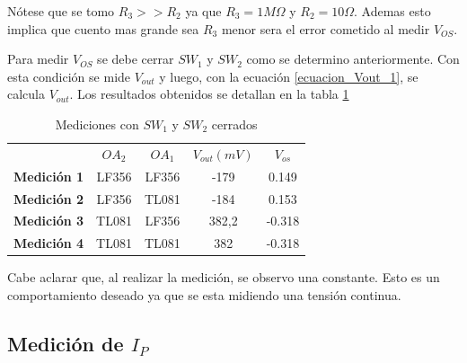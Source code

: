 Nótese que se tomo $R_3 >> R_2$ ya que $R_3 = 1M\Omega $ y $R_2 = 10\Omega$. Ademas esto implica que cuento mas grande sea $R_3$ menor sera el error cometido al medir $V_{OS}$.  

Para medir $V_{OS}$ se debe cerrar $SW_1$ y $SW_2$ como se determino anteriormente. Con esta condición se mide $V_{out}$ y luego, con la ecuación \ref{ecuacion_Vout_1}, se calcula $V_{out}$. Los resultados obtenidos se detallan en la tabla \ref{table2}

\begin{table}[h!]
    \centering
    \caption{Mediciones con $SW_1$ y $SW_2$ cerrados}
    \label{table2}
    \begin{tabular}{@{}ccccc@{}}
    
    \textbf{}           & \textbf{$OA_2$} & \textbf{$OA_1$} & \textbf{$V_{out}(mV)$} & \textbf{$V_{os}$} \\
    \textbf{Medición 1} & LF356          & LF356          & -179              &  0.149            \\
    \textbf{Medición 2} & LF356          & TL081          & -184              &  0.153            \\
    \textbf{Medición 3} & TL081          & LF356          & 382,2             &  -0.318            \\
    \textbf{Medición 4} & TL081          & TL081          & 382               &  -0.318            \\ 
    \end{tabular}
\end{table}

Cabe aclarar que, al realizar la medición, se observo una constante. Esto es un comportamiento deseado ya que se esta midiendo una tensión continua. 



\subsection{Medición de $I_{P}$}

